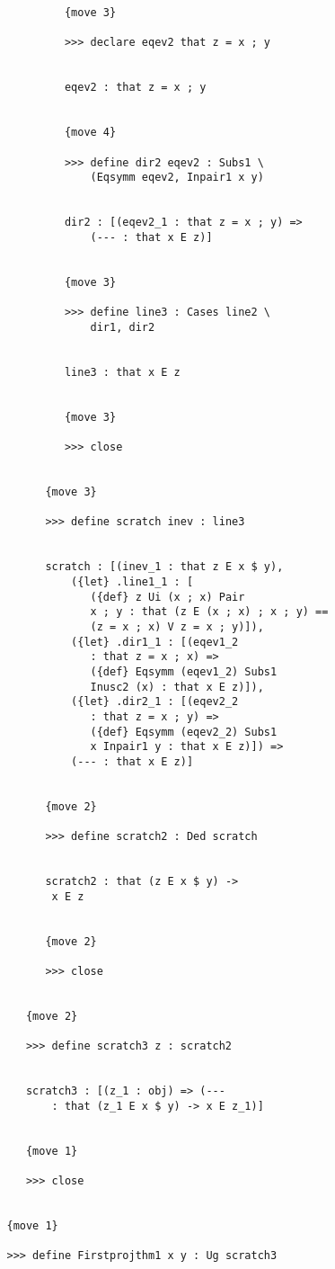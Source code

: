 \documentclass[12pt]{article}
\begin{document}
\begin{verbatim}
            {move 3}

            >>> declare eqev2 that z = x ; y


            eqev2 : that z = x ; y


            {move 4}

            >>> define dir2 eqev2 : Subs1 \
                (Eqsymm eqev2, Inpair1 x y)


            dir2 : [(eqev2_1 : that z = x ; y) => 
                (--- : that x E z)]


            {move 3}

            >>> define line3 : Cases line2 \
                dir1, dir2


            line3 : that x E z


            {move 3}

            >>> close


         {move 3}

         >>> define scratch inev : line3


         scratch : [(inev_1 : that z E x $ y), 
             ({let} .line1_1 : [
                ({def} z Ui (x ; x) Pair 
                x ; y : that (z E (x ; x) ; x ; y) == 
                (z = x ; x) V z = x ; y)]), 
             ({let} .dir1_1 : [(eqev1_2 
                : that z = x ; x) => 
                ({def} Eqsymm (eqev1_2) Subs1 
                Inusc2 (x) : that x E z)]), 
             ({let} .dir2_1 : [(eqev2_2 
                : that z = x ; y) => 
                ({def} Eqsymm (eqev2_2) Subs1 
                x Inpair1 y : that x E z)]) => 
             (--- : that x E z)]


         {move 2}

         >>> define scratch2 : Ded scratch


         scratch2 : that (z E x $ y) -> 
          x E z


         {move 2}

         >>> close


      {move 2}

      >>> define scratch3 z : scratch2


      scratch3 : [(z_1 : obj) => (--- 
          : that (z_1 E x $ y) -> x E z_1)]


      {move 1}

      >>> close


   {move 1}

   >>> define Firstprojthm1 x y : Ug scratch3



\end{verbatim}
\end{document}
